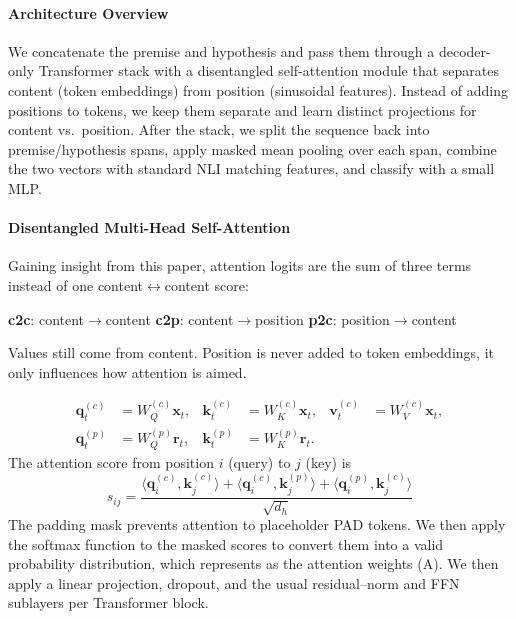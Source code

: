 \documentclass[11pt]{article}
\begin{document}
\paragraph{Architecture Overview}
We concatenate the premise and hypothesis and pass them through a decoder-only Transformer stack with a disentangled self-attention module that separates content (token embeddings) from position (sinusoidal features). Instead of adding positions to tokens, we keep them separate and learn distinct projections for content vs.\ position. After the stack, we split the sequence back into premise/hypothesis spans, apply masked mean pooling over each span, combine the two vectors with standard NLI matching features, and classify with a small MLP.

\paragraph{Disentangled Multi-Head Self-Attention}
Gaining insight from this paper\cite{he2020deberta}, attention logits are the sum of three terms  instead of one content$\leftrightarrow$content score:
\begin{itemize}
 \textbf{c2c}: content$\to$content
 \textbf{c2p}: content$\to$position 
 \textbf{p2c}: position$\to$content 
\end{itemize}
Values still come from content. Position is never added to token embeddings, it only influences how attention is aimed.

\begin{align}
\mathbf{q}^{(c)}_t&=W^{(c)}_Q \mathbf{x}_t,&
\mathbf{k}^{(c)}_t&=W^{(c)}_K \mathbf{x}_t,&
\mathbf{v}^{(c)}_t&=W^{(c)}_V \mathbf{x}_t,\\
\mathbf{q}^{(p)}_t&=W^{(p)}_Q \mathbf{r}_t,&
\mathbf{k}^{(p)}_t&=W^{(p)}_K \mathbf{r}_t. &&
\end{align}
The attention score from position $i$ (query) to $j$ (key) is
\begin{equation}
s_{ij}
= \frac{
\langle \mathbf{q}^{(c)}_i, \mathbf{k}^{(c)}_j\rangle
+ \langle \mathbf{q}^{(c)}_i, \mathbf{k}^{(p)}_j\rangle
+ \langle \mathbf{q}^{(p)}_i, \mathbf{k}^{(c)}_j\rangle
}{\sqrt{d_h}}
\end{equation}
The padding mask prevents attention to placeholder PAD tokens. We then apply the softmax function to the masked scores to convert them into a valid probability distribution, which represents as the attention weights (A).
We then apply a linear projection, dropout, and the usual residual--norm and FFN sublayers per Transformer block.
\end{document}
